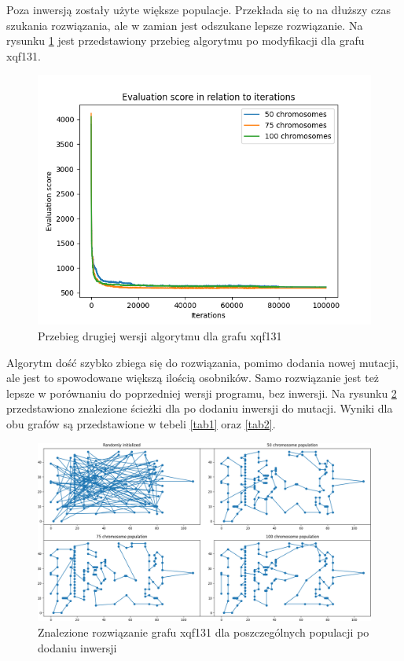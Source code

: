 \documentclass[11pt]{article}
\begin{document}
Poza inwersją zostały użyte większe populacje. Przekłada się to na dłuższy czas
szukania rozwiązania, ale w zamian jest odszukane lepsze rozwiązanie. Na
rysunku \cref{fig:131_inverse} jest przedstawiony przebieg algorytmu po
modyfikacji dla grafu xqf131.
\begin{figure}[h]
    \centering
    \includegraphics[scale=0.9]{img/131_inverse.png}
    \caption{Przebieg drugiej wersji algorytmu dla grafu xqf131}
    \label{fig:131_inverse}
\end{figure}
Algorytm dość szybko zbiega się do rozwiązania, pomimo dodania nowej mutacji,
ale jest to spowodowane większą ilością osobników. Samo rozwiązanie jest też
lepsze w porównaniu do poprzedniej wersji programu, bez inwersji.
Na rysunku \cref{fig:v2_solutions} przedstawiono znalezione ścieżki dla po
dodaniu inwersji do mutacji. Wyniki dla obu grafów są przedstawione w tebeli
\cref{tab1} oraz \cref{tab2}.
\begin{figure}
    \centerline{\includegraphics[scale=0.5]{../131_obrazy_inverse.png}}
    \caption{Znalezione rozwiązanie grafu xqf131 dla poszczególnych populacji po
    dodaniu inwersji}
    \label{fig:v2_solutions}
\end{figure}
\end{document}
